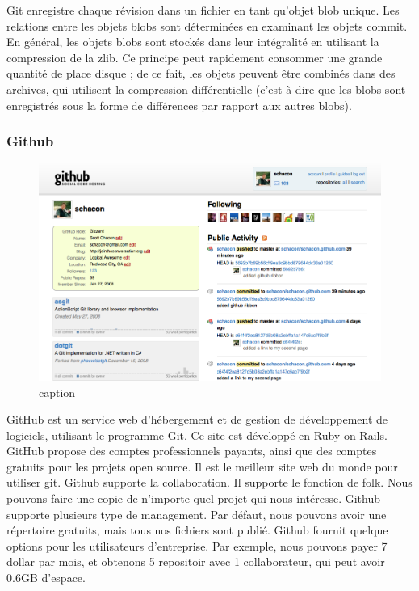 Git enregistre chaque révision dans un fichier en tant qu'objet blob unique. Les relations entre les objets blobs sont déterminées en examinant les objets commit. En général, les objets blobs sont stockés dans leur intégralité en utilisant la compression de la zlib. Ce principe peut rapidement consommer une grande quantité de place disque ; de ce fait, les objets peuvent être combinés dans des archives, qui utilisent la compression différentielle (c'est-à-dire que les blobs sont enregistrés sous la forme de différences par rapport aux autres blobs).

\subsubsection{Github} %


\begin{figure}[htbp]
	\centering
		\includegraphics[width=6in]{Image/githubCapture.png}
	\caption{caption}
	\label{fig:Image_githubCapture}
\end{figure}


GitHub est un service web d'hébergement et de gestion de développement de logiciels, utilisant le programme Git. Ce site est développé en Ruby on Rails. GitHub propose des comptes professionnels payants, ainsi que des comptes gratuits pour les projets open source. Il est le meilleur site web du monde pour utiliser git. Github supporte la collaboration. Il supporte le fonction de folk. Nous pouvons faire une copie de n'importe quel projet qui nous intéresse. Github supporte plusieurs type de management. Par défaut, nous pouvons avoir une répertoire gratuits, mais tous nos fichiers sont publié. Github fournit quelque options pour les utilisateurs d'entreprise. Par exemple, nous pouvons payer 7 dollar par mois, et obtenons 5 repositoir avec 1 collaborateur, qui peut avoir 0.6GB d'espace. 

